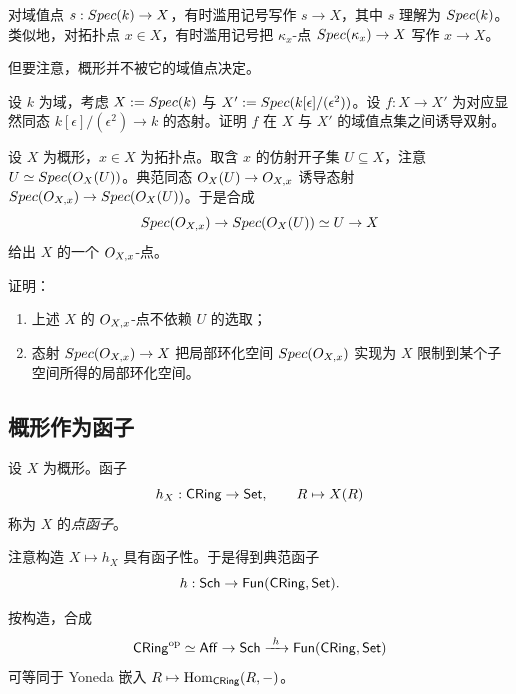 \begin{remark}\label{rem:8.1.3}
对域值点 $s:Spec(k)\to X$，有时滥用记号写作 $s\to X$，其中 $s$ 理解为 $Spec(k)$。类似地，对拓扑点 $x\in X$，有时滥用记号把 $\kappa_x$-点 $Spec(\kappa_x)\to X$ 写作 $x\to X$。

但要注意，概形并不被它的域值点决定。
\end{remark}

\begin{exercise}\label{exc:8.1.4}
设 $k$ 为域，考虑 $X:=Spec(k)$ 与 $X':=Spec(k[\epsilon]/(\epsilon^2))$。设 $f:X\to X'$ 为对应显然同态 $k[\epsilon]/(\epsilon^2)\to k$ 的态射。证明 $f$ 在 $X$ 与 $X'$ 的域值点集之间诱导双射。
\end{exercise}

\begin{construction}\label{con:8.1.5}
设 $X$ 为概形，$x\in X$ 为拓扑点。取含 $x$ 的仿射开子集 $U\subseteq X$，注意 $U\simeq Spec(O_X(U))$。典范同态 $O_X(U)\to O_{X,x}$ 诱导态射 $Spec(O_{X,x})\to Spec(O_X(U))$。于是合成
\[
Spec(O_{X,x})\to Spec(O_X(U))\simeq U\to X
\]
给出 $X$ 的一个 $O_{X,x}$-点。
\end{construction}

\begin{exercise}\label{exc:8.1.6}
证明：
\begin{enumerate}[label=(\arabic*),leftmargin=2em,itemsep=0.25ex]
  \item 上述 $X$ 的 $O_{X,x}$-点不依赖 $U$ 的选取；
  \item 态射 $Spec(O_{X,x})\to X$ 把局部环化空间 $Spec(O_{X,x})$ 实现为 $X$ 限制到某个子空间所得的局部环化空间。
\end{enumerate}
\end{exercise}

\subsection{概形作为函子}\label{sec:8.2}

\begin{definition}\label{def:8.2.1}
设 $X$ 为概形。函子
\[
h_X:\mathsf{CRing}\to\mathsf{Set},\qquad R\mapsto X(R)
\]
称为 $X$ 的\emph{点函子}。

注意构造 $X\mapsto h_X$ 具有函子性。于是得到典范函子
\[
h:\mathsf{Sch}\to\mathsf{Fun}(\mathsf{CRing},\mathsf{Set}).
\]
\end{definition}

\begin{remark}\label{rem:8.2.2}
按构造，合成
\[
\CRing^{\mathrm{op}}\simeq\mathsf{Aff}\to\Sch\xrightarrow{\ h\ }\mathsf{Fun}(\CRing,\Set)
\]
可等同于 Yoneda 嵌入 $R\mapsto\operatorname{Hom}_{\mathsf{CRing}}(R,-)$。
\end{remark}

